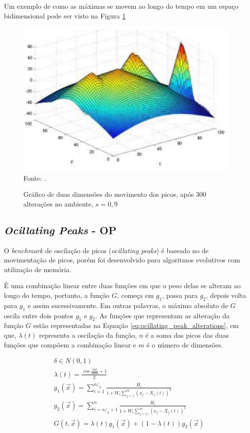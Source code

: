 Um exemplo de como as máximas se movem ao longo do tempo em um espaço bidimensional pode ser visto na Figura \ref{fig:moving_peaks}

\begin{figure}[!htb]
	\caption{Gráfico de duas dimensões do movimento dos picos, após 300 alterações no ambiente, $ s = 0,9 $}
	\centering
	\includegraphics[scale=0.5]{images/moving_peak.png}
	\label{fig:moving_peaks}{\\Fonte: .}
\end{figure}

\subsection{\textit{Ocillating Peaks} - OP}
\label{sec:ocillating_peaks}

O \textit{benchmark} de oscilação de picos (\textit{ocillating peaks}) é baseado no de movimentação de picos, porém foi desenvolvido para algoritmos evolutivos com utilização de memória.

É uma combinação linear entre duas funções em que o peso delas se alteram ao longo do tempo, portanto, a função $G$, começa em $g_1$, passa para $g_2$, depois volta para $g_1$ e assim sucessivamente. Em outras palavras, o máximo absoluto de $G$ oscila entre dois pontos $g_1$ e $g_2$. As funções que representam as alteração da função $G$ estão representadas na Equação \ref{eq:ocillating_peak_alterations}, em que, $\lambda (t)$ representa a oscilação da função, $n$ é a soma das picos das duas funções que compõem a combinação linear e $m$ é o número de dimensões.

\begin{equation}
\label{eq:ocillating_peak_alterations}
\begin{split}
& \delta \in N(0,1) \\
& \lambda (t) = \frac{\cos{\frac{2\pi t}{100\delta}} +1}{2} \\
& g_1(\vec{x}) = \sum_{i=1}^{n/_2} \frac{H_i}{1+W_i \sum_{j=1}^{m} (x_j - X_j(t))^2} \\
& g_2(\vec{x}) = \sum_{i=n/_2+1}^{n} \frac{H_i}{1+W_i \sum_{j=1)}^{m} (x_j - X_j(t))^2} \\
& G(t,\vec{x}) = \lambda (t) g_1(\vec{x}) + (1-\lambda (t))g_2(\vec{x})
\end{split}
\end{equation}

